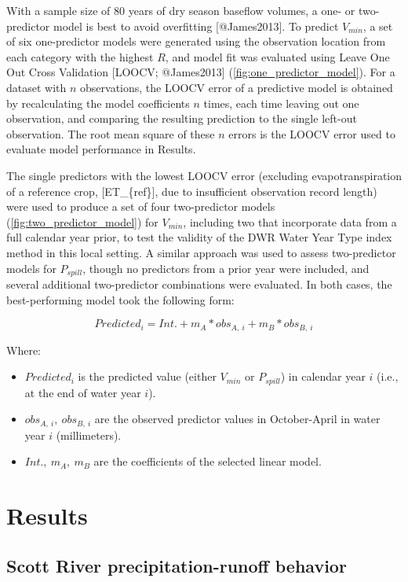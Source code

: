 \documentclass[
]{article}
\providecommand{\tightlist}{%
  \setlength{\itemsep}{0pt}\setlength{\parskip}{0pt}}
\begin{document}
With a sample size of 80 years of dry season baseflow volumes, a one- or
two-predictor model is best to avoid overfitting {[}@James2013{]}. To
predict \(V_{min}\), a set of six one-predictor models were generated
using the observation location from each category with the highest
\(R\), and model fit was evaluated using Leave One Out Cross Validation
{[}LOOCV; @James2013{]} (\autoref{fig:one_predictor_model}). For a
dataset with \(n\) observations, the LOOCV error of a predictive model
is obtained by recalculating the model coefficients \(n\) times, each
time leaving out one observation, and comparing the resulting prediction
to the single left-out observation. The root mean square of these \(n\)
errors is the LOOCV error used to evaluate model performance in Results.

The single predictors with the lowest LOOCV error (excluding
evapotranspiration of a reference crop, {[}ET\_\{ref\}{]}, due to
insufficient observation record length) were used to produce a set of
four two-predictor models (\autoref{fig:two_predictor_model}) for
\(V_{min}\), including two that incorporate data from a full calendar
year prior, to test the validity of the DWR Water Year Type index method
in this local setting. A similar approach was used to assess
two-predictor models for \(P_{spill}\), though no predictors from a
prior year were included, and several additional two-predictor
combinations were evaluated. In both cases, the best-performing model
took the following form:

\[Predicted_{i} = Int. + m_A * obs_{A,~i}+m_B*obs_{B,~i}\]

Where:

\begin{itemize}
\tightlist
\item
  \(Predicted_i\) is the predicted value (either \(V_{min}\) or
  \(P_{spill}\)) in calendar year \(i\) (i.e., at the end of water year
  \(i\)).
\item
  \(obs_{A,~i},~obs_{B,~i}\) are the observed predictor values in
  October-April in water year \(i\) (millimeters).
\item
  \(Int.,~m_A,~m_B\) are the coefficients of the selected linear model.
\end{itemize}

\hypertarget{results}{%
\section{Results}\label{results}}

\hypertarget{scott-river-precipitation-runoff-behavior}{%
\subsection{Scott River precipitation-runoff
behavior}\label{scott-river-precipitation-runoff-behavior}}
\end{document}
